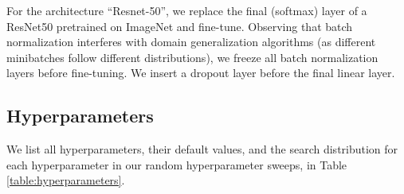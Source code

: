\documentclass{article}
\begin{document}
For the architecture ``Resnet-50'', we replace the final (softmax) layer of a ResNet50 pretrained on ImageNet and fine-tune. 
Observing that batch normalization interferes with domain generalization algorithms (as different minibatches follow different distributions), we freeze all batch normalization layers before fine-tuning.
We insert a dropout layer before the final linear layer.

\clearpage
\newpage
\subsection{Hyperparameters}

We list all hyperparameters, their default values, and the search distribution for each hyperparameter in our random hyperparameter sweeps, in Table \ref{table:hyperparameters}.
\end{document}
